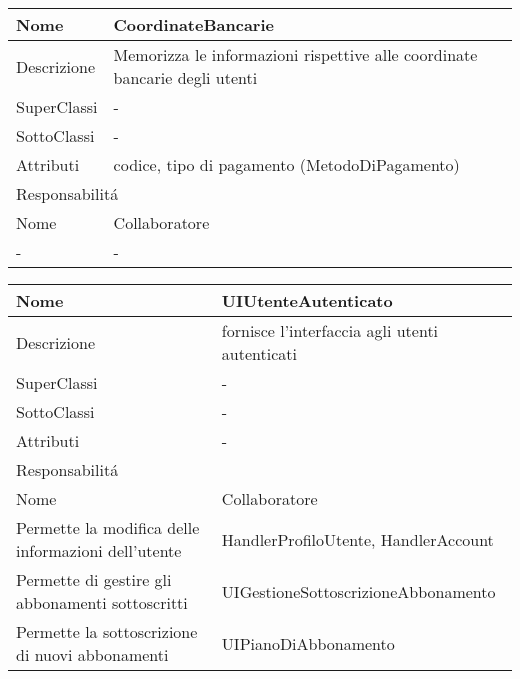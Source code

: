 \begin{center} %
    \begin{longtable}{ |p{3cm}|p{3cm}|p{3cm}|p{3cm}| }
        \hline
        Nome & \multicolumn{3}{|p{9cm}|}{CoordinateBancarie} \\\hline
        Descrizione & \multicolumn{3}{|p{9cm}|}{Memorizza le informazioni rispettive alle coordinate bancarie degli utenti} \\\hline
        SuperClassi & \multicolumn{3}{|p{9cm}|}{-} \\\hline
        SottoClassi & \multicolumn{3}{|p{9cm}|}{-} \\\hline
        Attributi & \multicolumn{3}{|p{9cm}|}{codice, tipo di pagamento (MetodoDiPagamento)} \\\hline
        \multicolumn{4}{|p{12cm}|}{Responsabilit\'a} \\\hline %
        \multicolumn{2}{|p{6cm}|}{Nome} & \multicolumn{2}{|p{6cm}|}{Collaboratore} \\\hline %
        \multicolumn{2}{|p{6cm}|}{-} & \multicolumn{2}{|p{6cm}|}{-} \\\hline
    \end{longtable}
\end{center}

\begin{center} %
    \begin{longtable}{ |p{3cm}|p{3cm}|p{3cm}|p{3cm}| }
        \hline
        Nome & \multicolumn{3}{|p{9cm}|}{UIUtenteAutenticato} \\\hline
        Descrizione & \multicolumn{3}{|p{9cm}|}{fornisce l'interfaccia agli utenti autenticati} \\\hline
        SuperClassi & \multicolumn{3}{|p{9cm}|}{-} \\\hline
        SottoClassi & \multicolumn{3}{|p{9cm}|}{-} \\\hline
        Attributi & \multicolumn{3}{|p{9cm}|}{-} \\\hline
        \multicolumn{4}{|p{12cm}|}{Responsabilit\'a} \\\hline %
        \multicolumn{2}{|p{6cm}|}{Nome} & \multicolumn{2}{|p{6cm}|}{Collaboratore} \\\hline %
        \multicolumn{2}{|p{6cm}|}{Permette la modifica delle informazioni dell'utente} & \multicolumn{2}{|p{6cm}|}{HandlerProfiloUtente, HandlerAccount} \\\hline
        \multicolumn{2}{|p{6cm}|}{Permette di gestire gli abbonamenti sottoscritti} & \multicolumn{2}{|p{6cm}|}{UIGestioneSottoscrizioneAbbonamento} \\\hline
        \multicolumn{2}{|p{6cm}|}{Permette la sottoscrizione di nuovi abbonamenti} & \multicolumn{2}{|p{6cm}|}{UIPianoDiAbbonamento} \\\hline
    \end{longtable}
\end{center}

